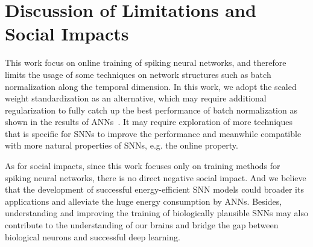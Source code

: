 \documentclass{article}
\begin{document}
\section{Discussion of Limitations and Social Impacts}

This work focus on online training of spiking neural networks, and therefore limits the usage of some techniques on network structures such as batch normalization along the temporal dimension. In this work, we adopt the scaled weight standardization as an alternative, which may require additional regularization to fully catch up the best performance of batch normalization as shown in the results of ANNs~\cite{brock2021characterizing}. It may require exploration of more techniques that is specific for SNNs to improve the performance and meanwhile compatible with more natural properties of SNNs, e.g. the online property.

As for social impacts, since this work focuses only on training methods for spiking neural networks, there is no direct negative social impact. And we believe that the development of successful energy-efficient SNN models could broader its applications and alleviate the huge energy consumption by ANNs. Besides, understanding and improving the training of biologically plausible SNNs may also contribute to the understanding of our brains and bridge the gap between biological neurons and successful deep learning.
\end{document}
